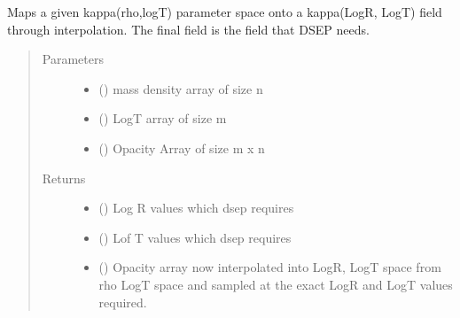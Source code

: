 \documentclass[letterpaper,10pt,english]{sphinxmanual}
\begin{document}
\begin{fulllineitems}
\label{\detokenize{pyTOPSScrape.api:pyTOPSScrape.api.convert.convert_rho_2_LogR}}
\sphinxAtStartPar
Maps a given kappa(rho,logT) parameter space onto a kappa(LogR, LogT) field
through interpolation. The final field is the field that DSEP needs.
\begin{quote}\begin{description}
\item[{Parameters}] \leavevmode\begin{itemize}
\item {} 
\sphinxAtStartPar
{} () \textendash{} mass density array of size n

\item {} 
\sphinxAtStartPar
{} () \textendash{} LogT array of size m

\item {} 
\sphinxAtStartPar
{} () \textendash{} Opacity Array of size m x n

\end{itemize}

\item[{Returns}] \leavevmode
\sphinxAtStartPar
\begin{itemize}
\item {} 
\sphinxAtStartPar
{} () \textendash{} Log R values which dsep requires

\item {} 
\sphinxAtStartPar
{} () \textendash{} Lof T values which dsep requires

\item {} 
\sphinxAtStartPar
{} () \textendash{} Opacity array now interpolated into LogR, LogT space from rho LogT
space and sampled at the exact LogR and LogT values required.

\end{itemize}


\end{description}\end{quote}

\end{fulllineitems}
\end{document}
